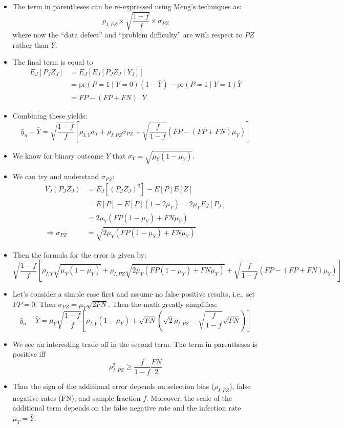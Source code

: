 \documentclass[12pt]{article}
\numberwithin{equation}{section}
\theoremstyle{plain}
\def\pr{\text{pr}}
\begin{document}
\begin{itemize}
\item The term in parentheses can be re-expressed using Meng's techniques as:
$$
\rho_{I, PZ} \times \sqrt{\frac{1-f}{f}} \times \sigma_{PZ}
$$
where now the ``data defect'' and ``problem difficulty'' are with respect to $PZ$ rather than $Y$.
\item The final term is equal to
$$
\begin{aligned}
E_J [P_J Z_J ] &= E_J [ E_J [ P_J Z_J \mid Y_J ] ] \\
&= \pr (P = 1 \mid Y = 0) (1-\bar Y) - \pr(P=1 \mid Y = 1) \bar Y \\
&= FP - (FP + FN) \cdot \bar Y
\end{aligned}
$$
\item Combining these yields:
$$
\bar y_n - \bar Y = \sqrt{\frac{1-f}{f}} \left[\rho_{I,Y} \sigma_Y + \rho_{I, PZ} \sigma_{PZ} + \sqrt{\frac{f}{1-f}} \left( FP - (FP+FN) \mu_Y \right) \right]
$$
\item We know for binary outcome $Y$ that $\sigma_Y = \sqrt{\mu_Y (1-\mu_Y)}$.
\item We can try and understand $\sigma_{PZ}$:
$$
\begin{aligned}
V_J(P_J Z_J) &= E_J[(P_J Z_J)^2] - E[P] E[Z] \\
&= E[P] - E[P] (1 - 2 \mu_Y) = 2 \mu_Y E_J [ P_J ] \\
&= 2 \mu_Y \left( FP (1-\mu_Y) + FN \mu_Y \right) \\
\Rightarrow \sigma_{PZ} &= \sqrt{ 2 \mu_Y \left( FP (1-\mu_Y) + FN \mu_Y \right) }
\end{aligned}
$$
\item Then the formula for the error is given by:
$$
\sqrt{\frac{1-f}{f}} \left[\rho_{I,Y} \sqrt{\mu_Y (1-\mu_Y)} + \rho_{I, PZ} \sqrt{ 2 \mu_Y \left( FP (1-\mu_Y) + FN \mu_Y \right )} + \sqrt{\frac{f}{1-f}} \left( FP - (FP+FN) \mu_Y \right) \right]
$$
\item Let's consider a simple case first and assume no false positive results, i.e., set $FP=0$.  Then $\sigma_{PZ} = \mu_Y \sqrt{2 FN}$.  Then the math greatly simplifies:
$$
\bar y_n - \bar Y = \mu_Y \sqrt{\frac{1-f}{f}} \left[\rho_{I,Y} (1-\mu_Y) + \sqrt{FN} \left( \sqrt{2} \rho_{I, PZ} - \sqrt{\frac{f}{1-f}} \sqrt{FN} \right)  \right]
$$
\item We see an interesting trade-off in the second term.  The term in parentheses is positive iff
$$
\rho^2_{I,PZ}  \geq \frac{f}{1-f} \frac{FN}{2}
$$
\item Thus the sign of the additional error depends on selection bias ($\rho_{I, PZ}$), false negative rates (FN), and sample fraction $f$.  Moreover, the scale of the additional term depends on the false negative rate and the infection rate $\mu_Y = \bar Y$.

\end{itemize}
\end{document}
